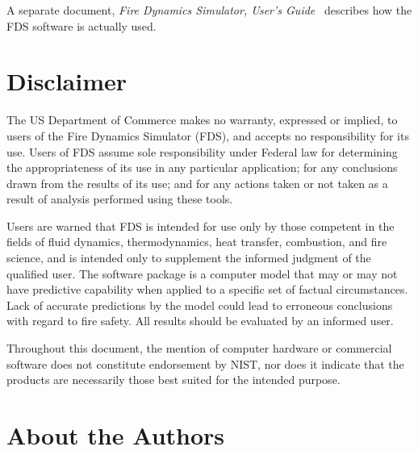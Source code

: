 \documentclass[11pt]{book}
\begin{document}
A separate document, {\em Fire Dynamics Simulator, User's Guide}~\cite{FDS_Users_Guide} describes how the FDS software is
actually used.


\chapter{Disclaimer}

The US Department of Commerce makes no warranty, expressed or implied,
to users of the Fire Dynamics Simulator (FDS), and accepts no responsibility for its use.
Users of FDS assume sole responsibility under Federal law for determining
the appropriateness of its use in any particular application;
for any conclusions drawn from the results of its use; and for any
actions taken or not taken as a result of analysis performed using these tools.

Users are warned that FDS is intended for use only by those competent
in the fields of fluid dynamics, thermodynamics, heat transfer, combustion, and fire science,
and is intended only to supplement the informed judgment of the qualified user.
The software package is a computer model that may or may not have predictive
capability when applied to a specific set of factual circumstances.
Lack of accurate predictions by the model could lead to erroneous
conclusions with regard to fire safety. All results should be evaluated by an informed user.

Throughout this document, the mention of computer hardware or commercial
software does not constitute endorsement by NIST, nor does it indicate that
the products are necessarily those best suited for the intended purpose.


\chapter{About the Authors}
\end{document}
